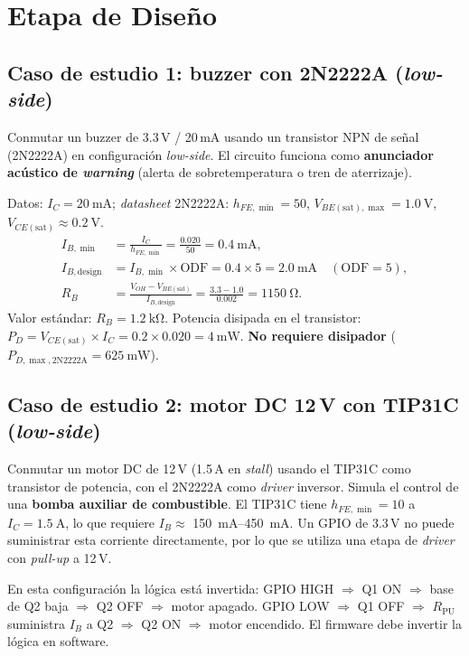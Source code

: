 \documentclass[11pt]{article}
\begin{document}
\section{Etapa de Diseño}

\subsection{Caso de estudio 1: buzzer con 2N2222A (\emph{low-side})}
Conmutar un buzzer de 3.3\,V / 20\,mA usando un transistor NPN de señal (2N2222A) en
configuración \emph{low-side}. El circuito funciona como \textbf{anunciador acústico de
\emph{warning}} (alerta de sobretemperatura o tren de aterrizaje).

Datos: $I_C=\SI{20}{\milli\ampere}$; \emph{datasheet} 2N2222A: $h_{FE,\min}=50$,
$V_{BE(\text{sat}),\max}=\SI{1.0}{\volt}$, $V_{CE(\text{sat})}\approx\SI{0.2}{\volt}$.
\begin{align}
  I_{B,\min} &= \frac{I_C}{h_{FE,\min}} = \frac{0.020}{50} = \SI{0.4}{\milli\ampere}, \\
  I_{B,\text{design}} &= I_{B,\min}\times\text{ODF} = 0.4\times 5 = \SI{2.0}{\milli\ampere}
        \quad (\text{ODF}=5), \\
  R_B &= \frac{V_{OH}-V_{BE(\text{sat})}}{I_{B,\text{design}}} = \frac{3.3-1.0}{0.002}
        = \SI{1150}{\ohm}.
\end{align}
Valor estándar: $R_B=\SI{1.2}{\kilo\ohm}$. Potencia disipada en el transistor:
$P_D = V_{CE(\text{sat})}\times I_C = 0.2\times 0.020 = \SI{4}{\milli\watt}$.
\textbf{No requiere disipador} ($P_{D,\max,\text{2N2222A}}=\SI{625}{\milli\watt}$).

\subsection{Caso de estudio 2: motor DC 12\,V con TIP31C (\emph{low-side})}
Conmutar un motor DC de 12\,V (1.5\,A en \emph{stall}) usando el TIP31C como transistor
de potencia, con el 2N2222A como \emph{driver} inversor. Simula el control de una
\textbf{bomba auxiliar de combustible}. El TIP31C tiene $h_{FE,\min}=10$ a
$I_C=\SI{1.5}{\ampere}$, lo que requiere $I_B\approx$ \SIrange{150}{450}{\milli\ampere}.
Un GPIO de 3.3\,V no puede suministrar esta corriente directamente, por lo que se utiliza
una etapa de \emph{driver} con \emph{pull-up} a 12\,V.

\begin{nota}
En esta configuración la lógica está invertida: GPIO HIGH $\Rightarrow$ Q1 ON
$\Rightarrow$ base de Q2 baja $\Rightarrow$ Q2 OFF $\Rightarrow$ motor apagado. GPIO LOW
$\Rightarrow$ Q1 OFF $\Rightarrow$ $R_\text{PU}$ suministra $I_B$ a Q2 $\Rightarrow$ Q2 ON
$\Rightarrow$ motor encendido. El firmware debe invertir la lógica en software.
\end{nota}
\end{document}
